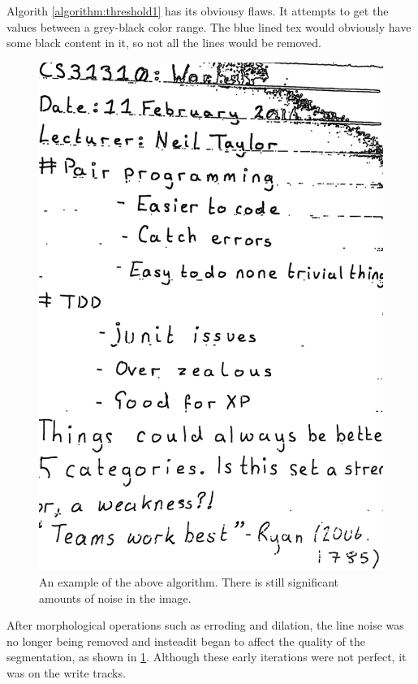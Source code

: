 Algorith \ref{algorithm:threshold1} has its obviousy flaws. It attempts to get the values between a grey-black color range. The blue lined tex would obviously have some black content in it, so not all the lines would be removed.

\begin{figure}[H]
  \centering
  \includegraphics{images/removed_lines_still_noise}
  \caption{An example of the above algorithm. There is still significant amounts of noise in the image.}
  \label{fig:remove_lines_noise}
\end{figure}

After morphological operations such as erroding and dilation, the line noise was no longer being removed and insteadit began to affect the quality of the segmentation, as shown in \ref{fig:remove_lines_noise}. Although these early iterations were not perfect, it was on the write tracks.

